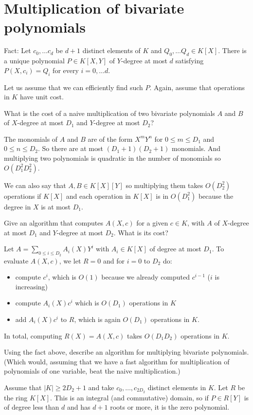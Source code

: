 \documentclass[11pt]{exam}
\theoremstyle{definition}
\begin{document}
{\begin{questions}
\end{questions}


\section{Multiplication of bivariate polynomials}
Fact: Let $c_0,\ldots c_d$ be $d+1$ distinct elements of $K$ and $Q_0,\ldots Q_d\in K[X]$. There is a unique polynomial $P\in K[X,Y]$ of $Y$-degree at most $d$ satisfying $P(X,c_i)=Q_i$ for every $i=0,\ldots d$.

Let us assume that we can efficiently find such $P$. Again, assume that operations in $K$ have unit cost.


\begin{questions}
\question What is the cost of a naive multiplication of two bivariate polynomials $A$ and $B$ of $X$-degree at most $D_1$ and $Y$-degree at most $D_2$?
\begin{solution}
The monomials of $A$ and $B$ are of the form $X^mY^n$ for $0 \leq m \leq D_1$ and $0 \leq n \leq D_2$. So there are at most $(D_1+1)(D_2+1)$ monomials. And multiplying two polynomials is quadratic in the number of monomials so $O(D_1^2 D_2^2)$.

We can also say that $A,B \in K[X][Y]$ so multiplying them takes $O(D_2^2)$ operations if $K[X]$ and each operation in $K[X]$ is in $O(D_1^2)$ because the degree in $X$ is at most $D_1$.
\end{solution}

\question Give an algorithm that computes $A(X,c)$ for a given $c\in K$, with $A$ of $X$-degree at most $D_1$ and $Y$-degree at most $D_2$. What is its cost?
\begin{solution}
Let $A = \sum_{0 \leq i \leq D_2} A_i(X)Y^i$ with $A_i \in K[X]$ of degree at most $D_1$. To evaluate $A(X,c)$, we let $R = 0$ and for $i = 0$ to $D_2$ do:
\begin{itemize}
\item compute $c^i$, which is $O(1)$ because we already computed $c^{i-1}$ ($i$ is increasing)
\item compute $A_i(X)c^i$ which is $O(D_1)$ operations in $K$
\item add $A_i(X)c^i$ to $R$, which is again $O(D_1)$ operations in $K$.
\end{itemize}
In total, computing $R(X) = A(X,c)$ takes $O(D_1 D_2)$ operations in $K$.
\end{solution}

\question Using the fact above, describe an algorithm for multiplying bivariate polynomials. (Which would, assuming that we have a fast algorithm for multiplication of polynomials of one variable, beat the naive multiplication.)
\begin{solution}
Assume that $|K| \geq 2D_2+1$ and take $c_0, \dots, c_{2D_2}$ distinct elements in $K$. Let $R$ be the ring $K[X]$. This is an integral (and commutative) domain, so if $P \in R[Y]$ is of degree less than $d$ and has $d+1$ roots or more, it is the zero polynomial.


\end{solution}
\end{questions}}
\end{document}
